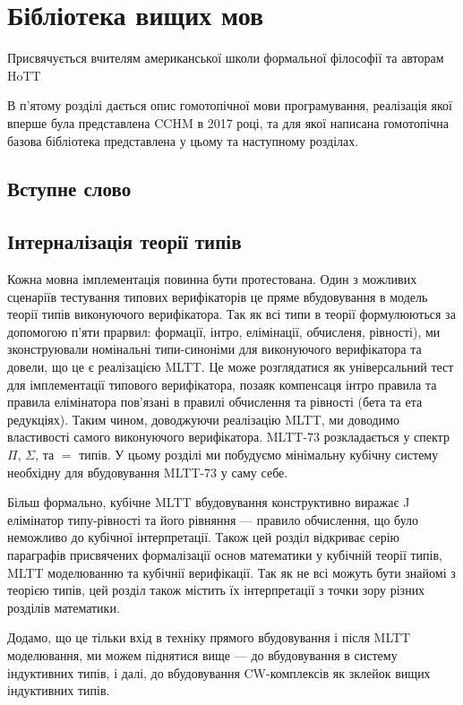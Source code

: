 \chapter{Бібліотека вищих мов}
\epigraph{Присвячується вчителям американської школи формальної філософії та авторам HoTT}{}
В п'ятому розділі дається опис гомотопічної мови програмування,
реалізація якої вперше була представлена CCHM в 2017 році, та для якої написана
гомотопічна базова бібліотека представлена у цьому та наступному розділах.

\section*{Вступне слово}

\section{Інтерналізація теорії типів}
Кожна мовна імплементація повинна бути протестована. Один з можливих сценаріїв
тестування типових верифікаторів це пряме вбудовування в модель теорії типів
виконуючого верифікатора. Так як всі типи в теорії формулюються за допомогою п'яти
прарвил: формації, інтро, елімінації, обчисленя, рівності), ми зконструювали
номінальні типи-синоніми для виконуючого верифікатора та довели,
що це є реалізацією MLTT. Це може розглядатися як універсальний
тест для імплементації типового верифікатора, позаяк компенсаця
інтро правила та правила елімінатора пов'язані в правилі обчислення
та рівності (бета та ета редукціях). Таким чином, доводжуючи реалізацію MLTT,
ми доводимо властивості самого виконуючого верифікатора.
MLTT-73 розкладається у спектр $\Pi$, $\Sigma$, та $=$ типів.
У цьому розділі ми побудуємо мінімальну кубічну систему необхідну
для вбудовування MLTT-73 у саму себе.

Більш формально, кубічне MLTT вбудовування конструктивно виражає
J елімінатор типу-рівності та його рівняння — правило обчислення,
що було неможливо до кубічної інтерпретації. Також цей розділ
відкриває серію параграфів присвячених формалізації основ математики у кубічній теорії типів,
MLTT моделюванню та кубічнії верифікації. Так як не всі можуть бути знайомі з теорією типів,
цей розділ також містить їх інтерпретації з точки зору різних розділів математики.

Додамо, що це тільки вхід в техніку прямого вбудовування і після MLTT моделювання,
ми можем піднятися вище — до вбудовування в систему індуктивних типів, і далі,
до вбудовування CW-комплексів як зклейок вищих індуктивних типів.

